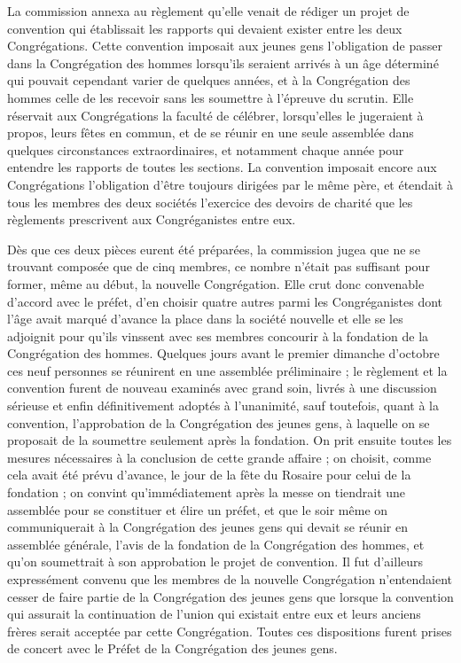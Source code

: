 La commission annexa au règlement qu'elle venait de rédiger un projet de convention qui établissait les rapports qui devaient exister entre les deux Congrégations. Cette convention imposait aux jeunes gens l'obligation de passer dans la Congrégation des hommes lorsqu'ils seraient arrivés à un âge déterminé qui pouvait cependant varier de quelques années, et à la Congrégation des hommes celle de les recevoir sans les soumettre à l'épreuve du scrutin. Elle réservait aux Congrégations la faculté de célébrer, lorsqu'elles le jugeraient à propos, leurs fêtes en commun, et de se réunir en une seule assemblée dans quelques circonstances extraordinaires, et notamment chaque année pour entendre les rapports de toutes les sections. La convention imposait encore aux Congrégations l'obligation d'être toujours dirigées par le même père, et étendait à tous les membres des deux sociétés l'exercice des devoirs de charité que les règlements prescrivent aux Congréganistes entre eux.

Dès que ces deux pièces eurent été préparées, la commission jugea que ne se trouvant composée que de cinq membres, ce nombre n'était pas suffisant pour former, même au début, la nouvelle Congrégation. Elle crut donc convenable d'accord avec le préfet, d'en choisir quatre autres parmi les Congréganistes dont l'âge avait marqué d'avance la place dans
la société nouvelle et elle se les adjoignit pour qu'ils vinssent avec ses membres concourir à la fondation de la Congrégation des hommes. Quelques jours avant le premier dimanche d'octobre ces neuf personnes se réunirent en une assemblée préliminaire ; le règlement et la convention furent de nouveau examinés avec grand soin, livrés à une discussion sérieuse et enfin définitivement adoptés à l'unanimité, sauf toutefois, quant à la convention, l'approbation de la Congrégation des jeunes gens, à laquelle on se proposait de la soumettre seulement après la fondation. On prit ensuite toutes les mesures nécessaires à la conclusion de cette grande affaire ; on choisit, comme cela avait été prévu d'avance, le jour de la fête du Rosaire pour celui de la fondation ; on convint qu'immédiatement après la messe on tiendrait une assemblée pour se constituer et élire un préfet, et que le soir même on communiquerait à la Congrégation des jeunes gens qui devait se réunir en assemblée générale, l'avis de la fondation de la Congrégation des hommes, et qu'on soumettrait à son approbation le projet de convention. Il fut d'ailleurs expressément convenu que les membres de la nouvelle Congrégation n'entendaient cesser de faire partie de la Congrégation des jeunes gens que lorsque la convention qui assurait la continuation de l'union qui existait entre eux et leurs anciens frères serait acceptée par cette Congrégation. Toutes ces dispositions furent prises de concert avec le Préfet de la Congrégation des jeunes gens.

